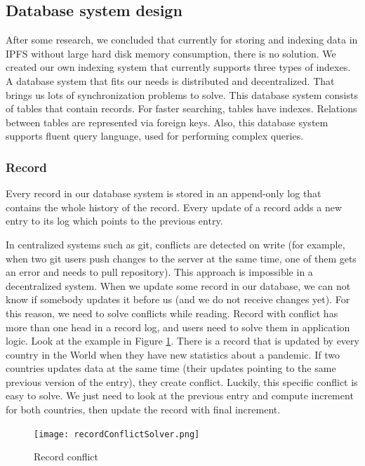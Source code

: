 \subsection{Database system design}
After some research, we concluded that currently for storing and indexing data in IPFS without large hard disk memory consumption, there is no solution. We created our own indexing system that currently supports three types of indexes. A database system that fits our needs is distributed and decentralized. That brings us lots of synchronization problems to solve. This database system consists of tables that contain records. For faster searching, tables have indexes. Relations between tables are represented via foreign keys. Also, this database system supports fluent query language, used for performing complex queries.

\subsubsection{Record} 
Every record in our database system is stored in an append-only log that contains the whole history of the record. Every update of a record adds a new entry to its log which points to the previous entry. 

In centralized systems such as git, conflicts are detected on write (for example, when two git users push changes to the server at the same time, one of them gets an error and needs to pull repository). This approach is impossible in a decentralized system. When we update some record in our database, we can not know if somebody updates it before us (and we do not receive changes yet). For this reason, we need to solve conflicts while reading. Record with conflict has more than one head in a record log, and users need to solve them in application logic. Look at the example in Figure \ref{recordConflict}. There is a record that is updated by every country in the World when they have new statistics about a pandemic. If two countries updates data at the same time (their updates pointing to the same previous version of the entry), they create conflict. Luckily, this specific conflict is easy to solve. We just need to look at the previous entry and compute increment for both countries, then update the record with final increment.


\begin{figure}[h]
    \centering
    \texttt{[image: recordConflictSolver.png]}
    \caption{Record conflict}
    \label{recordConflict}
\end{figure}


